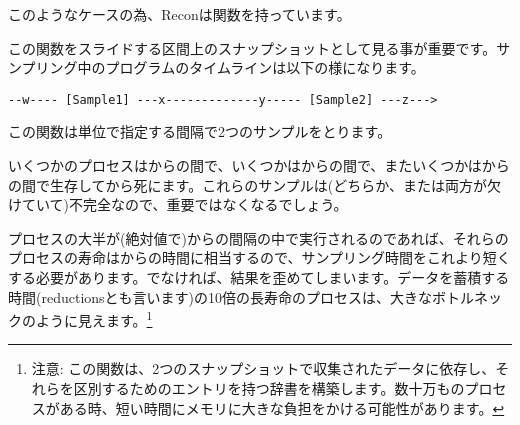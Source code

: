 このようなケースの為、Reconは関数を持っています。

この関数をスライドする区間上のスナップショットとして見る事が重要です。サンプリング中のプログラムのタイムラインは以下の様になります。

\begin{Verbatim}
--w---- [Sample1] ---x-------------y----- [Sample2] ---z--->
\end{Verbatim}

この関数は単位で指定する間隔で2つのサンプルをとります。

いくつかのプロセスはからの間で、いくつかはからの間で、またいくつかはからの間で生存してから死にます。これらのサンプルは(どちらか、または両方が欠けていて)不完全なので、重要ではなくなるでしょう。

プロセスの大半が(絶対値で)からの間隔の中で実行されるのであれば、それらのプロセスの寿命はからの時間に相当するので、サンプリング時間をこれより短くする必要があります。でなければ、結果を歪めてしまいます。データを蓄積する時間(reductionsとも言います)の10倍の長寿命のプロセスは、大きなボトルネックのように見えます。\footnote{注意: この関数は、2つのスナップショットで収集されたデータに依存し、それらを区別するためのエントリを持つ辞書を構築します。数十万ものプロセスがある時、短い時間にメモリに大きな負担をかける可能性があります。}

